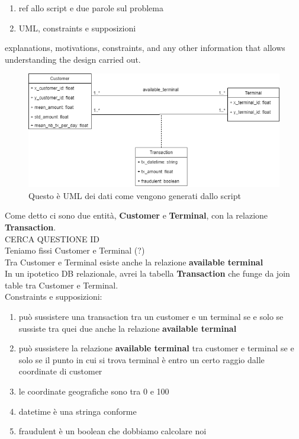 \documentclass[runningheads]{llncs}
\begin{document}
\begin{enumerate}
    \item ref allo script e due parole sul problema
    \item UML, constraints e supposizioni
\end{enumerate}
explanations, motivations, constraints, and any other information that allows understanding the design carried out.
\\
\begin{figure}[!htb] 
        \centering \includegraphics[width=0.9\columnwidth]{images/FraudDetectionUML.png}
        \caption{\label{fig1}Questo è UML dei dati come vengono generati dallo script}
\end{figure}
Come detto ci sono due entità, \textbf{Customer} e \textbf{Terminal}, con la relazione \textbf{Transaction}.
\\
CERCA QUESTIONE ID
\\
Teniamo fissi Customer e Terminal (?)
\\
Tra Customer e Terminal esiste anche la relazione \textbf{available terminal}
\\
In un ipotetico DB relazionale, avrei la tabella \textbf{Transaction} che funge da join table tra Customer e Terminal.
\\
Constraints e supposizioni:
\begin{enumerate}
    \item può sussistere una transaction tra un customer e un terminal se e solo se sussiste tra quei due anche la relazione \textbf{available terminal}
    \item può sussistere la relazione \textbf{available terminal} tra customer e terminal se e solo se il punto in cui si trova terminal è entro un certo raggio dalle coordinate di customer
    \item le coordinate geografiche sono tra 0 e 100
    \item datetime è una stringa conforme
    \item fraudulent è un boolean che dobbiamo calcolare noi
\end{enumerate}
\end{document}

